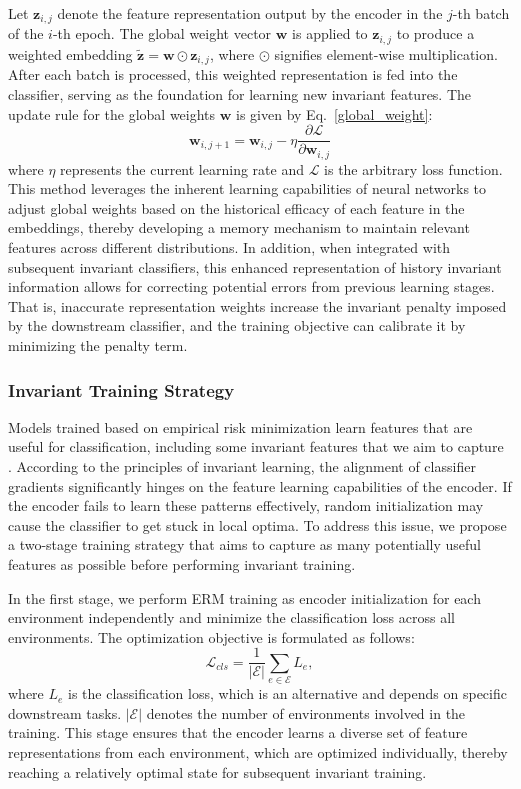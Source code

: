 Let $\mathbf{z}_{i,j}$ denote the feature representation output by the encoder in the $j$-th batch of the $i$-th epoch. The global weight vector $\mathbf{w}$ is applied to $\mathbf{z}_{i,j}$ to produce a weighted embedding $\tilde{\mathbf{z}} = \mathbf{w} \odot \mathbf{z}_{i,j}$, where $\odot$ signifies element-wise multiplication. After each batch is processed, this weighted representation is fed into the classifier, serving as the foundation for learning new invariant features. The update rule for the global weights $\mathbf{w}$ is given by Eq.~\ref{global_weight}:
\begin{equation}
\label{global_weight}
\mathbf{w}_{i,j+1}=\mathbf{w}_{i,j}-\eta \frac{\partial \mathcal{L}}{\partial \mathbf{w}_{i,j}}
\end{equation}
where $\eta$ represents the current learning rate and $\mathcal{L}$ is the arbitrary loss function. This method leverages the inherent learning capabilities of neural networks to adjust global weights based on the historical efficacy of each feature in the embeddings, thereby developing a memory mechanism to maintain relevant features across different distributions. In addition, when integrated with subsequent invariant classifiers, this enhanced representation of history invariant information allows for correcting potential errors from previous learning stages. That is, inaccurate representation weights increase the invariant penalty imposed by the downstream classifier, and the training objective can calibrate it by minimizing the penalty term.

\subsubsection{Invariant Training Strategy}
Models trained based on empirical risk minimization learn features that are useful for classification, including some invariant features that we aim to capture \cite{FAT}. According to the principles of invariant learning, the alignment of classifier gradients significantly hinges on the feature learning capabilities of the encoder. If the encoder fails to learn these patterns effectively, random initialization may cause the classifier to get stuck in local optima. To address this issue, we propose a two-stage training strategy that aims to capture as many potentially useful features as possible before performing invariant training.

In the first stage, we perform ERM training as encoder initialization for each environment independently and minimize the classification loss across all environments. The optimization objective is formulated as follows:
\begin{equation}
\label{l_cls}
\mathcal{L}_{cls} = \frac{1}{|\mathcal{E}|} \sum_{e \in \mathcal{E}} L_{e},
\end{equation}
where $L_{e}$ is the classification loss, which is an alternative and depends on specific downstream tasks. $|\mathcal{E}|$ denotes the number of environments involved in the training. This stage ensures that the encoder learns a diverse set of feature representations from each environment, which are optimized individually, thereby reaching a relatively optimal state for subsequent invariant training.

